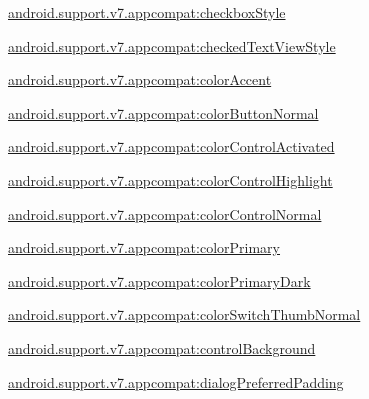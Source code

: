{\ttfamily \hyperlink{classandroid_1_1support_1_1v7_1_1appcompat_1_1R_1_1styleable_af7ac616091affeb34fec71e5ee8b5c65}{android.\+support.\+v7.\+appcompat\+:checkbox\+Style}}

{\ttfamily \hyperlink{classandroid_1_1support_1_1v7_1_1appcompat_1_1R_1_1styleable_aa6468311a9d0b5f772dae98fbcf245cd}{android.\+support.\+v7.\+appcompat\+:checked\+Text\+View\+Style}}

{\ttfamily \hyperlink{classandroid_1_1support_1_1v7_1_1appcompat_1_1R_1_1styleable_aff4d2589b88c34cd389125973debcd18}{android.\+support.\+v7.\+appcompat\+:color\+Accent}}

{\ttfamily \hyperlink{classandroid_1_1support_1_1v7_1_1appcompat_1_1R_1_1styleable_a8b1a254d15e9a8ad527d4515f5395b3c}{android.\+support.\+v7.\+appcompat\+:color\+Button\+Normal}}

{\ttfamily \hyperlink{classandroid_1_1support_1_1v7_1_1appcompat_1_1R_1_1styleable_a9111aa1922570418c642eb40adbae88e}{android.\+support.\+v7.\+appcompat\+:color\+Control\+Activated}}

{\ttfamily \hyperlink{classandroid_1_1support_1_1v7_1_1appcompat_1_1R_1_1styleable_a504c897bce159e8458dad5fa7717be03}{android.\+support.\+v7.\+appcompat\+:color\+Control\+Highlight}}

{\ttfamily \hyperlink{classandroid_1_1support_1_1v7_1_1appcompat_1_1R_1_1styleable_a3a60170ac3e2b1e037970b2ba1eea507}{android.\+support.\+v7.\+appcompat\+:color\+Control\+Normal}}

{\ttfamily \hyperlink{classandroid_1_1support_1_1v7_1_1appcompat_1_1R_1_1styleable_a26d76193ccbedca9d0812bd6a9da153c}{android.\+support.\+v7.\+appcompat\+:color\+Primary}}

{\ttfamily \hyperlink{classandroid_1_1support_1_1v7_1_1appcompat_1_1R_1_1styleable_af91ab112f2b33d3628adc9f30b24ba98}{android.\+support.\+v7.\+appcompat\+:color\+Primary\+Dark}}

{\ttfamily \hyperlink{classandroid_1_1support_1_1v7_1_1appcompat_1_1R_1_1styleable_a879b8157b7dcefca9179aa3158069301}{android.\+support.\+v7.\+appcompat\+:color\+Switch\+Thumb\+Normal}}

{\ttfamily \hyperlink{classandroid_1_1support_1_1v7_1_1appcompat_1_1R_1_1styleable_adbd4cb3df33f5d9a2b7c946af26dee6c}{android.\+support.\+v7.\+appcompat\+:control\+Background}}

{\ttfamily \hyperlink{classandroid_1_1support_1_1v7_1_1appcompat_1_1R_1_1styleable_a2ec375fd86ae1937bc7084ae55cb13ac}{android.\+support.\+v7.\+appcompat\+:dialog\+Preferred\+Padding}}

